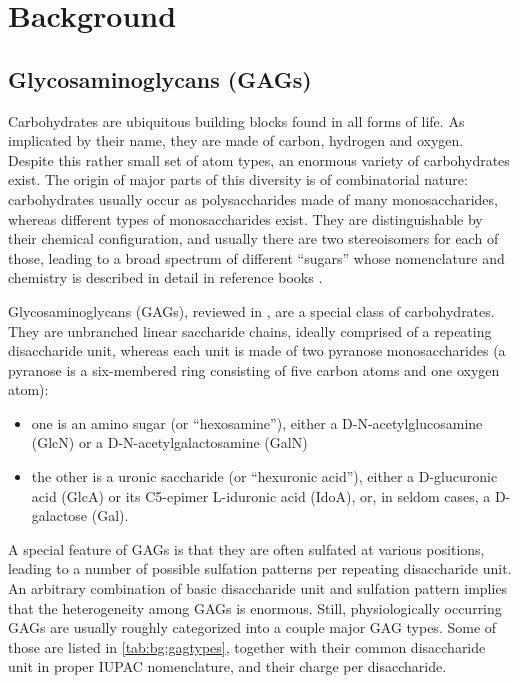 \chapter{Background}
\label{background}

\section{Glycosaminoglycans (GAGs)}
\label{background:gags}

Carbohydrates are ubiquitous building blocks found in all forms of life. As
implicated by their name, they are made of carbon, hydrogen and oxygen. Despite
this rather small set of atom types, an enormous variety of carbohydrates exist.
The origin of major parts of this diversity is of combinatorial nature:
carbohydrates usually occur as polysaccharides made of many monosaccharides,
whereas different types of monosaccharides exist. They are distinguishable by
their chemical configuration, and usually there are two stereoisomers for each
of those, leading to a broad spectrum of different \enquote{sugars} whose
nomenclature and chemistry is described in detail in reference books
\cite{carbohydrate_chemistry_robyt_1998,carbohydrate_chemistry_royal_2000}.

Glycosaminoglycans (GAGs), reviewed in
\cite{essentials_glycobiology_gags_chapter_2009}, are a special class of
carbohydrates. They are unbranched linear saccharide chains, ideally comprised
of a repeating disaccharide unit, whereas each unit is made of two pyranose
monosaccharides (a pyranose is a six-membered ring consisting of five carbon
atoms and one oxygen atom):

\begin{itemize}
\item one is an amino sugar (or \enquote{hexosamine}), either a
D-N-acetylglucosamine (GlcN) or a D-N-acetylgalactosamine (GalN)
\item the other is a uronic saccharide (or \enquote{hexuronic acid}), either a
D-glucuronic acid (GlcA) or its C5-epimer L-iduronic acid (IdoA), or, in seldom
cases, a D-galactose (Gal).
\end{itemize}

A special feature of GAGs is that they are often sulfated at various positions,
leading to a number of possible sulfation patterns per repeating disaccharide
unit. An arbitrary combination of basic disaccharide unit and sulfation pattern
implies that the heterogeneity among GAGs is enormous. Still, physiologically
occurring GAGs are usually roughly categorized into a couple major GAG types.
Some of those are listed in \cref{tab:bg:gagtypes}, together with their common
disaccharide unit in proper IUPAC nomenclature, and their charge per
disaccharide.


